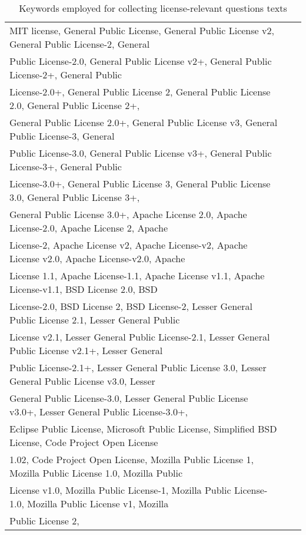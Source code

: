 \begin{table*}
  \caption{Keywords employed for collecting license-relevant questions texts}
  \label{tab:keywords}
  \begin{adjustbox}{width=0.98\textwidth}
  \begin{tabular}{lll}
    \hline
MIT license, 
General Public License, 
General Public License v2, 
General Public License-2, 
General \\Public License-2.0, 
General Public License v2+, 
General Public License-2+, 
General Public \\License-2.0+, 
General Public License 2, 
General Public License 2.0, 
General Public License 2+, \\
General Public License 2.0+, 
General Public License v3,  
General Public License-3, 
General \\Public License-3.0,
General Public License v3+, 
General Public License-3+, 
General Public\\ License-3.0+, 
General Public License 3, 
General Public License 3.0,
General Public License 3+, \\
General Public License 3.0+, 
Apache License 2.0, 
Apache License-2.0, 
Apache License 2, 
Apache \\License-2, 
Apache License v2, 
Apache License-v2, 
Apache License v2.0,
Apache License-v2.0, 
Apache \\License 1.1, 
Apache License-1.1, 
Apache License v1.1, 
Apache License-v1.1, 
BSD License 2.0, 
BSD \\License-2.0, 
BSD License 2, 
BSD License-2, 
Lesser General Public License 2.1, 
Lesser General Public\\ License v2.1, 
Lesser General Public License-2.1, 
Lesser General Public License v2.1+,
Lesser General \\Public License-2.1+, 
Lesser General Public License 3.0, 
Lesser General Public License v3.0, 
Lesser \\General Public License-3.0, 
Lesser General Public License v3.0+, 
Lesser General Public License-3.0+, \\
Eclipse Public License, 
Microsoft Public License, 
Simplified BSD License, 
Code Project Open License \\1.02, 
Code Project Open License, 
Mozilla Public License 1, 
Mozilla Public License 1.0, 
Mozilla Public \\License v1.0, 
Mozilla Public License-1, 
Mozilla Public License-1.0, 
Mozilla Public License v1, 
Mozilla \\Public License 2, 

\end{tabular}
\end{adjustbox}
\end{table*}

